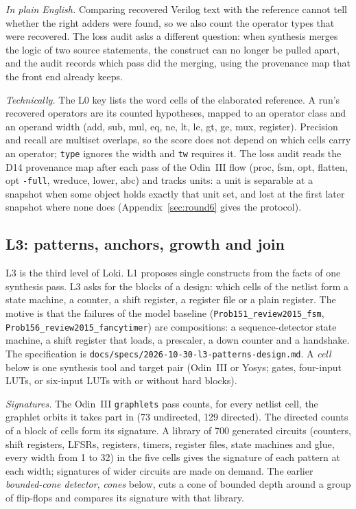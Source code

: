 \documentclass[conference]{IEEEtran}
\newcommand{\code}[1]{\texttt{#1}}
\begin{document}
\emph{In plain English.} Comparing recovered Verilog text with the reference cannot tell whether
the right adders were found, so we also count the operator types that were recovered. The loss
audit asks a different question: when synthesis merges the logic of two source statements, the
construct can no longer be pulled apart, and the audit records which pass did the merging, using the
provenance map that the front end already keeps.

\emph{Technically.} The L0 key lists the word cells of the elaborated reference. A run's recovered
operators are its counted hypotheses, mapped to an operator class and an operand width (add, sub,
mul, eq, ne, lt, le, gt, ge, mux, register). Precision and recall are multiset overlaps, so the
score does not depend on which cells carry an operator; \code{type} ignores the width and \code{tw}
requires it. The loss audit reads the D14 provenance map after each pass of the Odin~III flow
(proc, fsm, opt, flatten, opt \code{-full}, wreduce, lower, abc) and tracks units: a unit is
separable at a snapshot when some object holds exactly that unit set, and lost at the first later
snapshot where none does (Appendix~\ref{sec:round6} gives the protocol).

\subsection{L3: patterns, anchors, growth and join}
\label{sec:l3-method}

L3 is the third level of Loki. L1 proposes single constructs from the facts of one synthesis pass. L3
asks for the blocks of a design: which cells of the netlist form a state machine, a counter, a shift
register, a register file or a plain register. The motive is that the failures of the model baseline
(\code{Prob151\_review2015\_fsm}, \code{Prob156\_review2015\_fancytimer}) are compositions: a
sequence-detector state machine, a shift register that loads, a prescaler, a down counter and a
handshake. The specification is \code{docs/specs/2026-10-30-l3-patterns-design.md}. A \emph{cell}
below is one synthesis tool and target pair (Odin~III or Yosys; gates, four-input LUTs, or
six-input LUTs with or without hard blocks).

\emph{Signatures.} The Odin~III \code{graphlets} pass counts, for every netlist cell, the
graphlet orbits it takes part in (73 undirected, 129 directed). The directed counts of a block of
cells form its signature. A library of 700 generated circuits (counters, shift registers, LFSRs,
registers, timers, register files, state machines and glue, every width from 1 to 32) in the five
cells gives the signature of each pattern at each width; signatures of wider circuits are made on demand.
The earlier \emph{bounded-cone detector}, \emph{cones} below, cuts a cone of bounded depth around a group of flip-flops and compares its signature with that library.
\end{document}
